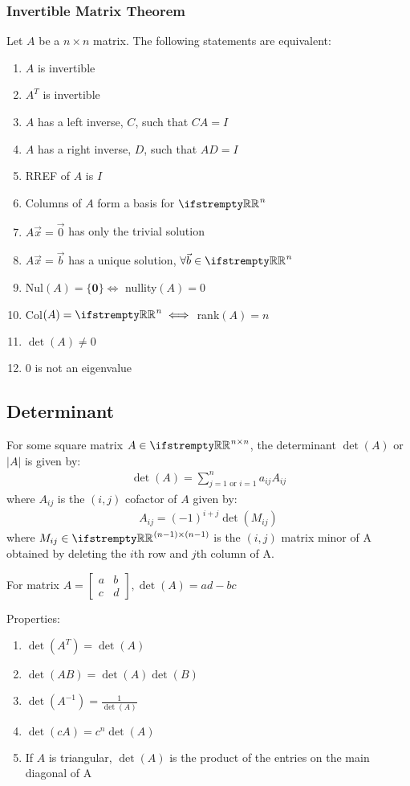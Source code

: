 \documentclass[12pt, a4paper]{article}
\begin{document}
\begin{multicols*}{3}
\subsubsection{Invertible Matrix Theorem}
Let $A$ be a $n \times n$ matrix. The following statements are equivalent:
\begin{enumerate}[\roman*.]
  \item $A$ is invertible
  \item $A^T$ is invertible
  \item $A$ has a left inverse, $C$, such that $CA = I$
  \item $A$ has a right inverse, $D$, such that $AD = I$
  \item RREF of $A$ is $I$
  \item Columns of $A$ form a basis for $\RR^n$
  \item $A\vec{x} = \vec{0}$ has only the trivial solution
  \item $A\vec{x} = \vec{b}$ has a unique solution, $\forall \vec{b} \in \RR^n$
  \item Nul$(A) = \{\mathbf{0}\} \iff$ nullity$(A) = 0$
  \item Col$(A) = \RR^n \iff$ rank$(A) = n$
  \item $\det(A) \neq 0$
  \item $0$ is not an eigenvalue
\end{enumerate}

\colbreak

\subsection{Determinant}
For some square matrix $A \in \RR^{n{\times}n}$, the determinant $\det(A)$ or $|A|$ is given by:
\begin{align*}
  \det(A) = \sum^n_{j=1 \text{ or } i=1}a_{ij}A_{ij}
\end{align*}
where $A_{ij}$ is the $(i, j)$ cofactor of $A$ given by:
\begin{align*}
  A_{ij} = (-1)^{i+j}\det(M_{ij})
\end{align*}
where $M_{ij} \in \RR^{(n-1){\times}(n-1)}$ is the $(i, j)$ matrix minor of A obtained by deleting the $i$th row and $j$th column of A.

For matrix $A = \begin{bmatrix} a & b \\ c & d\end{bmatrix}, \det(A) = ad-bc $

Properties:
\begin{enumerate}[\roman*.]
  \item $\det(A^T) = \det(A)$
  \item $\det(AB) = \det(A)\det(B)$
  \item $\det(A^{-1}) = \frac{1}{\det(A)}$
  \item $\det(cA) = c^n\det(A)$ 
  \item If $A$ is triangular, $\det(A)$ is the product of the entries on the main diagonal of A
\end{enumerate}


\end{multicols*}
\end{document}
